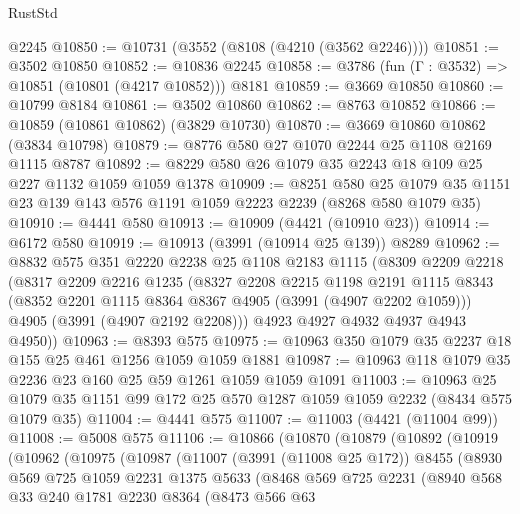 \begin{lexlean}{RustStd}
\begin{coremodule}
    @2245
@10850 := @10731 (@3552 (@8108 (@4210 (@3562 @2246))))
@10851 := @3502 @10850
@10852 := @10836 @2245
@10858 := @3786 (fun (Γ : @3532) => @10851 (@10801 (@4217 @10852))) @8181
@10859 := @3669 @10850
@10860 := @10799 @8184
@10861 := @3502 @10860
@10862 := @8763 @10852
@10866 := @10859 (@10861 @10862) (@3829 @10730)
@10870 := @3669 @10860 @10862 (@3834 @10798)
@10879 := @8776 @580 @27 @1070 @2244 @25 @1108 @2169 @1115 @8787
@10892 := @8229 @580 @26 @1079 @35 @2243 @18 @109 @25 @227 @1132 @1059 @1059 @1378
@10909 := @8251
    @580
    @25
    @1079
    @35
    @1151
    @23
    @139
    @143
    @576
    @1191
    @1059
    @2223
    @2239
    (@8268 @580 @1079 @35)
@10910 := @4441 @580
@10913 := @10909 (@4421 (@10910 @23))
@10914 := @6172 @580
@10919 := @10913 (@3991 (@10914 @25 @139)) @8289
@10962 := @8832
    @575
    @351
    @2220
    @2238
    @25
    @1108
    @2183
    @1115
    (@8309
      @2209
      @2218
      (@8317
        @2209
        @2216
        @1235
        (@8327
          @2208
          @2215
          @1198
          @2191
          @1115
          @8343
          (@8352 @2201 @1115 @8364 @8367 @4905 (@3991 (@4907 @2202 @1059)))
          @4905
          (@3991 (@4907 @2192 @2208)))
        @4923
        @4927
        @4932
        @4937
        @4943
        @4950))
@10963 := @8393 @575
@10975 := @10963 @350 @1079 @35 @2237 @18 @155 @25 @461 @1256 @1059 @1059 @1881
@10987 := @10963 @118 @1079 @35 @2236 @23 @160 @25 @59 @1261 @1059 @1059 @1091
@11003 := @10963
    @25
    @1079
    @35
    @1151
    @99
    @172
    @25
    @570
    @1287
    @1059
    @1059
    @2232
    (@8434 @575 @1079 @35)
@11004 := @4441 @575
@11007 := @11003 (@4421 (@11004 @99))
@11008 := @5008 @575
@11106 := @10866
    (@10870
      (@10879
        (@10892
          (@10919
            (@10962
              (@10975
                (@10987
                  (@11007
                    (@3991 (@11008 @25 @172))
                    @8455
                    (@8930
                      @569
                      @725
                      @1059
                      @2231
                      @1375
                      @5633
                      (@8468
                        @569
                        @725
                        @2231
                        (@8940
                          @568
                          @33
                          @240
                          @1781
                          @2230
                          @8364
                          (@8473
                            @566
                            @63

\end{coremodule}
\end{lexlean}
